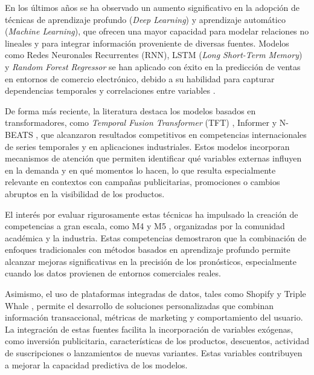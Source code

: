En los últimos años se ha observado un aumento significativo en la adopción de
 técnicas de aprendizaje profundo (\textit{Deep Learning}) y aprendizaje 
 automático (\textit{Machine Learning}), que ofrecen una mayor capacidad
  para modelar relaciones no lineales y para integrar información proveniente de
   diversas fuentes. Modelos como Redes Neuronales Recurrentes (RNN), LSTM 
   (\textit{Long Short-Term Memory}) \citep{LSTM} y \textit{Random Forest Regressor} se han 
   aplicado con éxito en la predicción de ventas en entornos de comercio 
   electrónico, debido a su habilidad para capturar dependencias temporales y 
   correlaciones entre variables \citep{hochreiter1997lstm, goodfellow2016deep, breiman2001random, bandara2020forecast}.

De forma más reciente, la literatura destaca los modelos basados en 
transformadores, como \textit{Temporal Fusion Transformer} (TFT) \citep{lim2021temporal}, Informer \citep{zhou2021informer} y N-BEATS \citep{oreshkin2019nbeats}, que alcanzaron resultados competitivos en competencias 
internacionales de series temporales y en aplicaciones industriales.
 Estos modelos incorporan mecanismos de atención que permiten identificar qué 
 variables externas influyen en la demanda y en qué momentos lo hacen, lo que 
 resulta especialmente relevante en contextos con campañas publicitarias, 
 promociones o cambios abruptos en la visibilidad de los productos.

El interés por evaluar rigurosamente estas técnicas ha impulsado la creación de 
competencias a gran escala, como M4 y M5 \citep{makridakis2020m5}, organizadas por la comunidad académica
 y la industria. Estas competencias demostraron que la combinación de enfoques 
 tradicionales con métodos basados en aprendizaje profundo permite alcanzar 
 mejoras significativas en la precisión de los pronósticos, especialmente 
 cuando los datos provienen de entornos comerciales reales.

 Asimismo, el uso de plataformas integradas de datos, tales como Shopify 
 \citep{shopify} y Triple Whale \citep{triplewhale}, permite el desarrollo de 
 soluciones personalizadas que combinan información transaccional, métricas de 
 marketing y comportamiento del usuario. La integración de estas fuentes 
 facilita la incorporación de variables exógenas, como inversión publicitaria, 
 características de los productos, descuentos, actividad de suscripciones o 
 lanzamientos de nuevas variantes. Estas variables contribuyen a mejorar la 
 capacidad predictiva de los modelos.

